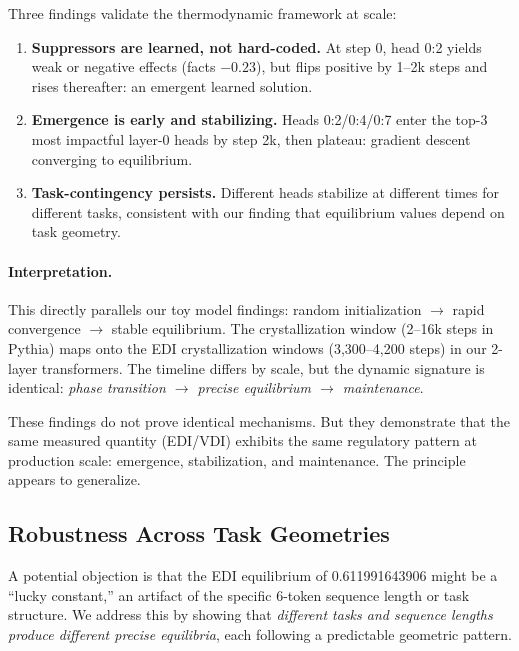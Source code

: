 Three findings validate the thermodynamic framework at scale:
\begin{enumerate}
    \item \textbf{Suppressors are learned, not hard-coded.} At step 0, head 0:2 yields weak or negative effects (facts $-0.23$), but flips positive by 1--2k steps and rises thereafter: an emergent learned solution.
    \item \textbf{Emergence is early and stabilizing.} Heads 0:2/0:4/0:7 enter the top-3 most impactful layer-0 heads by step 2k, then plateau: gradient descent converging to equilibrium.
    \item \textbf{Task-contingency persists.} Different heads stabilize at different times for different tasks, consistent with our finding that equilibrium values depend on task geometry.
\end{enumerate}

\paragraph{Interpretation.}
This directly parallels our toy model findings: random initialization $\to$ rapid convergence $\to$ stable equilibrium. The crystallization window (2--16k steps in Pythia) maps onto the EDI crystallization windows (3,300--4,200 steps) in our 2-layer transformers. The timeline differs by scale, but the dynamic signature is identical: \emph{phase transition $\to$ precise equilibrium $\to$ maintenance}.

These findings do not prove identical mechanisms. But they demonstrate that the same measured quantity (EDI/VDI) exhibits the same regulatory pattern at production scale: emergence, stabilization, and maintenance. The principle appears to generalize.

\subsection{Robustness Across Task Geometries}

A potential objection is that the EDI equilibrium of 0.611991643906 might be a ``lucky constant,'' an artifact of the specific 6-token sequence length or task structure. We address this by showing that \emph{different tasks and sequence lengths produce different precise equilibria}, each following a predictable geometric pattern.

